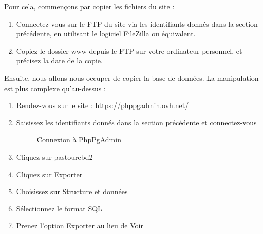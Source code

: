 \documentclass[11pt]{report}
\begin{document}
Pour cela, commençons par copier les fichiers du site  : 
\begin{enumerate}
\item Connectez vous sur le FTP du site via les identifiants donnés dans la
section précédente, en utilisant le logiciel FileZilla ou équivalent.
\item Copiez le dossier \og www \fg{} depuis le FTP sur votre ordinateur
personnel, et précisez la date de la copie. \\
\end{enumerate}

\par Ensuite, nous allons nous occuper de copier la base de données. La
manipulation est plus complexe qu'au-dessus : 
\begin{enumerate}
\item Rendez-vous sur le site : https://phppgadmin.ovh.net/
\item Saisissez les identifiants donnés dans la section précédente et 
connectez-vous

\begin{figure}[htp] 
\caption{Connexion à PhpPgAdmin}
\end{figure}

\item Cliquez sur \og pastourebd2 \fg{}
\item Cliquez sur \og Exporter \fg{}
\item Choisissez sur \og Structure et données \fg{}
\item Sélectionnez le format \og SQL \fg{}
\item Prenez l'option \og Exporter \fg{} au lieu de \og Voir \fg{}


\end{enumerate}
\end{document}
